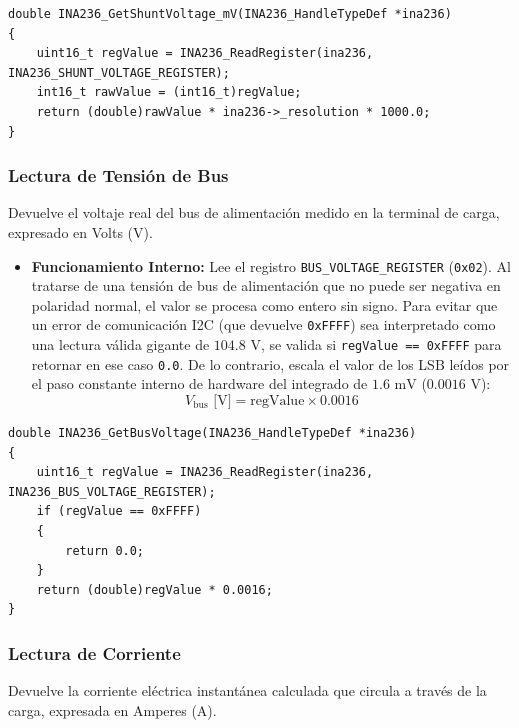 \documentclass[
10pt, %
a4paper, %
oneside, %
headinclude,footinclude, %
BCOR5mm, %
]{scrartcl}
\begin{document}
\begin{lstlisting}[style=CMakeStyle]
double INA236_GetShuntVoltage_mV(INA236_HandleTypeDef *ina236)
{
    uint16_t regValue = INA236_ReadRegister(ina236, INA236_SHUNT_VOLTAGE_REGISTER);
    int16_t rawValue = (int16_t)regValue;
    return (double)rawValue * ina236->_resolution * 1000.0;
}
\end{lstlisting}

\subsubsection{Lectura de Tensión de Bus}
Devuelve el voltaje real del bus de alimentación medido en la terminal de carga, expresado en Volts (V).

\begin{itemize}
	\item \textbf{Funcionamiento Interno:}
		Lee el registro \texttt{BUS\_VOLTAGE\_REGISTER} (\texttt{0x02}). Al tratarse de una tensión de bus de alimentación que no puede ser negativa en polaridad normal, el valor se procesa como entero sin signo. Para evitar que un error de comunicación I2C (que devuelve \texttt{0xFFFF}) sea interpretado como una lectura válida gigante de $104.8\text{ V}$, se valida si \texttt{regValue == 0xFFFF} para retornar en ese caso \texttt{0.0}. De lo contrario, escala el valor de los LSB leídos por el paso constante interno de hardware del integrado de $1.6\text{ mV}$ ($0.0016\text{ V}$):
		\begin{equation}
			V_{\text{bus}}\text{ [V]} = \text{regValue} \times 0.0016
		\end{equation}
\end{itemize}

\begin{lstlisting}[style=CMakeStyle]
double INA236_GetBusVoltage(INA236_HandleTypeDef *ina236)
{   
    uint16_t regValue = INA236_ReadRegister(ina236, INA236_BUS_VOLTAGE_REGISTER);
    if (regValue == 0xFFFF)
    {
        return 0.0;
    }
    return (double)regValue * 0.0016;
}
\end{lstlisting}

\subsubsection{Lectura de Corriente}
Devuelve la corriente eléctrica instantánea calculada que circula a través de la carga, expresada en Amperes (A).
\end{document}
